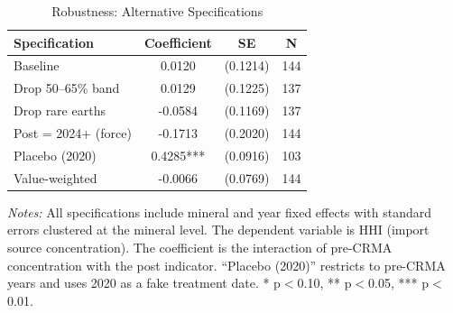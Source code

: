 \begin{table}[H]
\centering
\caption{Robustness: Alternative Specifications}
\label{tab:robustness}
\begin{threeparttable}
\begin{tabular}{lccc}
\toprule
Specification & Coefficient & SE & N \\
\midrule
Baseline & 0.0120 & (0.1214) & 144 \\
Drop 50--65\% band & 0.0129 & (0.1225) & 137 \\
Drop rare earths & -0.0584 & (0.1169) & 137 \\
Post = 2024+ (force) & -0.1713 & (0.2020) & 144 \\
Placebo (2020) & 0.4285*** & (0.0916) & 103 \\
Value-weighted & -0.0066 & (0.0769) & 144 \\
\bottomrule
\end{tabular}
\begin{tablenotes}[flushleft]
\small
\item \textit{Notes:} All specifications include mineral and year fixed effects with standard errors clustered at the mineral level. The dependent variable is HHI (import source concentration). The coefficient is the interaction of pre-CRMA concentration with the post indicator. ``Placebo (2020)'' restricts to pre-CRMA years and uses 2020 as a fake treatment date. * p$<$0.10, ** p$<$0.05, *** p$<$0.01.
\end{tablenotes}
\end{threeparttable}
\end{table}
